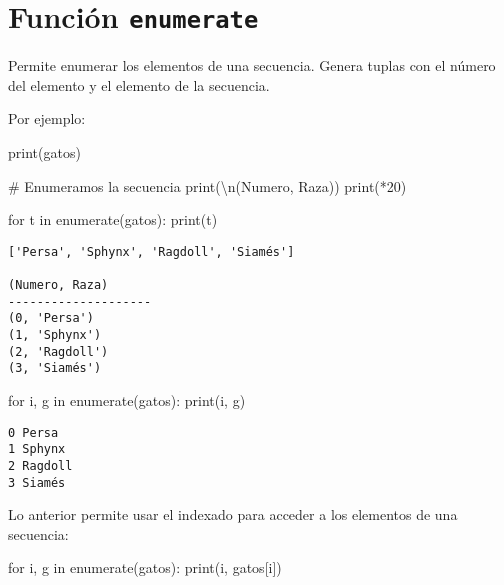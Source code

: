\documentclass[
  letterpaper,
  DIV=11,
  numbers=noendperiod]{scrreprt}
\newenvironment{Shaded}{\begin{snugshade}}{\end{snugshade}}
\newcommand{\BuiltInTok}[1]{\textcolor[rgb]{0.00,0.23,0.31}{#1}}
\newcommand{\CharTok}[1]{\textcolor[rgb]{0.13,0.47,0.30}{#1}}
\newcommand{\CommentTok}[1]{\textcolor[rgb]{0.37,0.37,0.37}{#1}}
\newcommand{\ControlFlowTok}[1]{\textcolor[rgb]{0.00,0.23,0.31}{#1}}
\newcommand{\DecValTok}[1]{\textcolor[rgb]{0.68,0.00,0.00}{#1}}
\newcommand{\KeywordTok}[1]{\textcolor[rgb]{0.00,0.23,0.31}{#1}}
\newcommand{\NormalTok}[1]{\textcolor[rgb]{0.00,0.23,0.31}{#1}}
\newcommand{\OperatorTok}[1]{\textcolor[rgb]{0.37,0.37,0.37}{#1}}
\newcommand{\StringTok}[1]{\textcolor[rgb]{0.13,0.47,0.30}{#1}}
\begin{document}
\section{\texorpdfstring{Función
\texttt{enumerate}}{Función enumerate}}\label{funciuxf3n-enumerate}

Permite enumerar los elementos de una secuencia. Genera tuplas con el
número del elemento y el elemento de la secuencia.

Por ejemplo:

\begin{Shaded}
\begin{Highlighting}[]
\BuiltInTok{print}\NormalTok{(gatos)}

\CommentTok{\# Enumeramos la secuencia}
\BuiltInTok{print}\NormalTok{(}\StringTok{\textquotesingle{}}\CharTok{\textbackslash{}n}\StringTok{(Numero, Raza)\textquotesingle{}}\NormalTok{)}
\BuiltInTok{print}\NormalTok{(}\StringTok{\textquotesingle{}{-}\textquotesingle{}}\OperatorTok{*}\DecValTok{20}\NormalTok{)}

\ControlFlowTok{for}\NormalTok{ t }\KeywordTok{in} \BuiltInTok{enumerate}\NormalTok{(gatos):}
    \BuiltInTok{print}\NormalTok{(t)}
\end{Highlighting}
\end{Shaded}

\begin{verbatim}
['Persa', 'Sphynx', 'Ragdoll', 'Siamés']

(Numero, Raza)
--------------------
(0, 'Persa')
(1, 'Sphynx')
(2, 'Ragdoll')
(3, 'Siamés')
\end{verbatim}

\begin{Shaded}
\begin{Highlighting}[]
\ControlFlowTok{for}\NormalTok{ i, g }\KeywordTok{in} \BuiltInTok{enumerate}\NormalTok{(gatos):}
    \BuiltInTok{print}\NormalTok{(i, g)}
\end{Highlighting}
\end{Shaded}

\begin{verbatim}
0 Persa
1 Sphynx
2 Ragdoll
3 Siamés
\end{verbatim}

Lo anterior permite usar el indexado para acceder a los elementos de una
secuencia:

\begin{Shaded}
\begin{Highlighting}[]
\ControlFlowTok{for}\NormalTok{ i, g }\KeywordTok{in} \BuiltInTok{enumerate}\NormalTok{(gatos):}
    \BuiltInTok{print}\NormalTok{(i, gatos[i])}
\end{Highlighting}
\end{Shaded}
\end{document}
